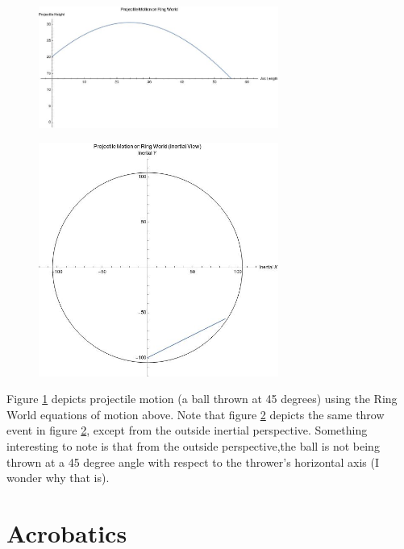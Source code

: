 \documentclass{amsart}
\theoremstyle{definition}
\begin{document}
\begin{figure}[h]
  \centering
  \includegraphics[width=0.7\textwidth]{ArclengthProjectileLabeled.jpg}
  \label{fig:shipview}
  \caption{}
\end{figure}


\begin{figure}[h]
  \centering
  \includegraphics[width=0.7\textwidth]{InertialArclengthProjectileLabeled.jpg}
  \label{fig:inertialview}
  \caption{}
\end{figure}

Figure \ref{fig:shipview} depicts projectile motion (a ball thrown at
45 degrees) using the Ring World equations of motion above. Note that
figure \ref{fig:inertialview} depicts the same throw event in figure
\ref{fig:inertialview}, except from the outside inertial
perspective. Something interesting to note is that from the outside
perspective,the ball is not being thrown at a 45 degree angle with
respect to the thrower's horizontal axis (I wonder why that is).


\section{Acrobatics}
\end{document}
